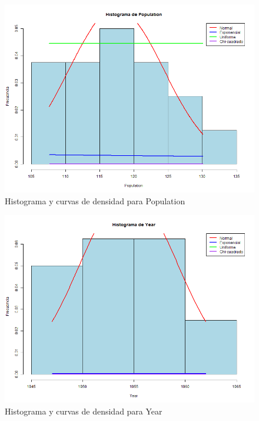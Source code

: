 \documentclass{article}
\begin{document}
\begin{figure}[H]
    \centering
    \includegraphics[width=\textwidth]{HistogramasDensidad/histograma_Population.png}
    \caption{Histograma y curvas de densidad para Population}
\end{figure}

\begin{figure}[H]
    \centering
    \includegraphics[width=\textwidth]{HistogramasDensidad/histograma_Year.png}
    \caption{Histograma y curvas de densidad para Year}
\end{figure}
\end{document}
